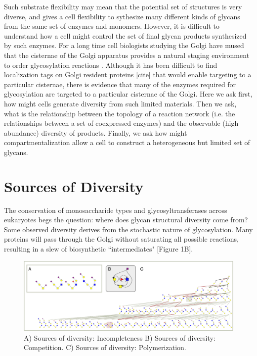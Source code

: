 \documentclass[twocolumn]{article}
\begin{document}
Such substrate flexibility may mean that the potential set of structures is very diverse, and gives a cell flexibility to sythesize many different kinds of glycans from the same set of enzymes and monomers. However, it is difficult to understand how a cell might control the set of final glycan products synthesized by such enzymes. For a long time cell biologists studying the Golgi have mused that the cisternae of the Golgi apparatus provides a natural staging environment to order glycosylation reactions \cite{Dunphy1985}. Although it has been difficult to find localization tags on Golgi resident proteins [cite] that would enable targeting to a particular cisternae, there is evidence that many of the enzymes required for glycosylation are targeted to a particular cisternae of the Golgi. Here we ask first, how might cells generate diversity from such limited materials. Then we ask, what is the relationship between the topology of a reaction network (i.e. the relationships between a set of coexpressed enzymes) and the observable (high abundance) diversity of products.  Finally, we ask how might compartmentalization allow a cell to construct a heterogeneous but limited set of glycans.

\section*{Sources of Diversity}
The conservation of monosaccharide types and glycosyltransferases across eukaryotes begs the question: where does glycan structural diversity come from? Some observed diversity derives from the stochastic nature of glycosylation.  Many proteins will pass through the Golgi without saturating all possible reactions, resulting in a slew of biosynthetic ``intermediates" [Figure 1B].  

\begin{figure}
    \includegraphics[width=\textwidth]{Figure_2.pdf}
	\caption{A) Sources of diversity: Incompleteness B) Sources of diversity: Competition. C) Sources of diversity: Polymerization.}
\end{figure}
\end{document}
